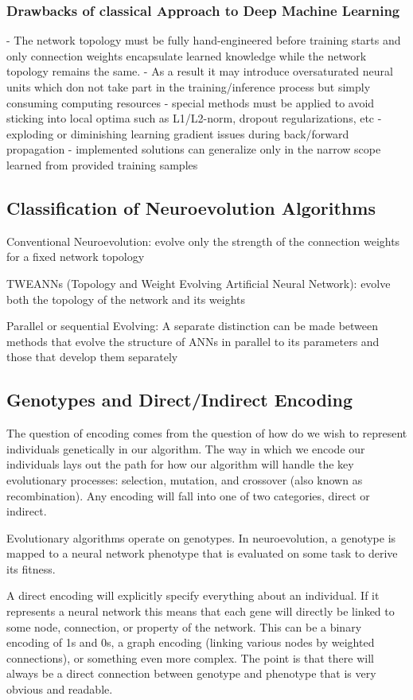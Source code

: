 \documentclass[journal, a4paper]{IEEEtran}
\begin{document}
\subsubsection{Drawbacks of classical Approach to Deep Machine Learning}

- The network topology must be fully hand-engineered before training starts and only connection weights encapsulate learned knowledge while the network topology remains the same.
- As a result it may introduce oversaturated neural units which don not take part in the training/inference process but simply consuming computing resources
- special methods must be applied to avoid sticking into local optima such as L1/L2-norm, dropout regularizations, etc
- exploding or diminishing learning gradient issues during back/forward propagation
- implemented solutions can generalize only in the narrow scope learned from provided training samples

\subsection{Classification of Neuroevolution Algorithms}
Conventional Neuroevolution:
evolve only the strength of the connection weights for a fixed network topology

TWEANNs (Topology and Weight Evolving Artificial Neural Network):
evolve both the topology of the network and its weights

Parallel or sequential Evolving:
A separate distinction can be made between methods that evolve the structure of ANNs in parallel to its parameters and those that develop them separately


\subsection{Genotypes and Direct/Indirect Encoding}
The question of encoding comes from the question of how do we wish to represent individuals genetically in our algorithm. The way in which we encode our individuals lays out the path for how our algorithm will handle the key evolutionary processes: selection, mutation, and crossover (also known as recombination). Any encoding will fall into one of two categories, direct or indirect.

Evolutionary algorithms operate on genotypes. In neuroevolution, a genotype is mapped to a neural network phenotype that is evaluated on some task to derive its fitness.

A direct encoding will explicitly specify everything about an individual. If it represents a neural network this means that each gene will directly be linked to some node, connection, or property of the network. This can be a binary encoding of 1s and 0s, a graph encoding (linking various nodes by weighted connections), or something even more complex. The point is that there will always be a direct connection between genotype and phenotype that is very obvious and readable. \cite{cite02}
\end{document}
